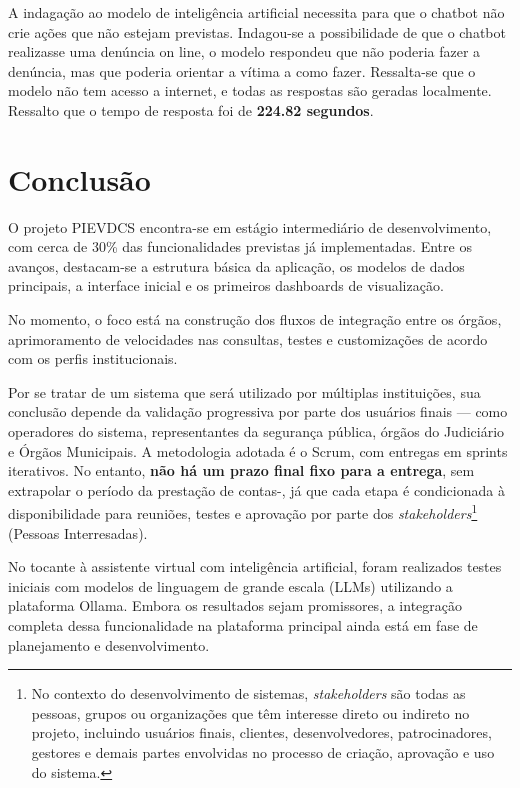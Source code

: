 \par A indagação ao modelo de inteligência artificial necessita para que o chatbot não crie ações que não estejam previstas. Indagou-se a possibilidade de que o chatbot realizasse uma denúncia on line, o modelo respondeu que não poderia fazer a denúncia, mas que poderia orientar a vítima a como fazer. Ressalta-se que o modelo não tem acesso a internet, e todas as respostas são geradas localmente. Ressalto que o tempo de resposta foi de \textbf{224.82 segundos}.

\section{Conclusão}

\par O projeto PIEVDCS encontra-se em estágio intermediário de desenvolvimento, com cerca de 30\% das funcionalidades previstas já implementadas. Entre os avanços, destacam-se a estrutura básica da aplicação, os modelos de dados principais, a interface inicial e os primeiros dashboards de visualização.

\par No momento, o foco está na construção dos fluxos de integração entre os órgãos, aprimoramento de velocidades nas consultas, testes e customizações de acordo com os perfis institucionais.

\par Por se tratar de um sistema que será utilizado por múltiplas instituições, sua conclusão depende da validação progressiva por parte dos usuários finais — como operadores do sistema, representantes da segurança pública, órgãos do Judiciário e Órgãos Municipais. A metodologia adotada é o Scrum, com entregas em sprints iterativos. No entanto, \textbf{não há um prazo final fixo para a entrega}, sem extrapolar o período da prestação de contas-, já que cada etapa é condicionada à disponibilidade para reuniões, testes e aprovação por parte dos \textit{stakeholders}\footnote{No contexto do desenvolvimento de sistemas, \textit{stakeholders} são todas as pessoas, grupos ou organizações que têm interesse direto ou indireto no projeto, incluindo usuários finais, clientes, desenvolvedores, patrocinadores, gestores e demais partes envolvidas no processo de criação, aprovação e uso do sistema.} (Pessoas Interresadas).

\par No tocante à assistente virtual com inteligência artificial, foram realizados testes iniciais com modelos de linguagem de grande escala (LLMs) utilizando a plataforma Ollama. Embora os resultados sejam promissores, a integração completa dessa funcionalidade na plataforma principal ainda está em fase de planejamento e desenvolvimento.

